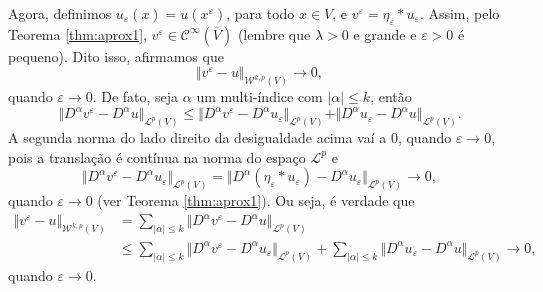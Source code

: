 \documentclass[a4paper, 11pt]{book}
\theoremstyle{definition}
\newcommand{\cC}{\mathcal{C}}
\newcommand{\cL}{\mathcal{L}}
\newcommand{\cW}{\mathcal{W}}
\begin{document}
\begin{prf}
    Agora, definimos $u_\varepsilon(x) = u(x^\varepsilon)$, para todo $x \in V$, e $v^\varepsilon = \eta_\varepsilon * u_\varepsilon$. Assim, pelo Teorema \ref{thm:aprox1}, $v^\varepsilon \in \cC^{\infty}(\overline{V})$ (lembre que $\lambda > 0$ e grande e $\varepsilon > 0$ é pequeno). 
    Dito isso, afirmamos que
    \[
        \Vert v^\varepsilon - u \Vert_{\cW^{k,p}(V)} \to 0,
    \]
    quando $\varepsilon \to 0$.
    De fato, seja $\alpha $ um multi-índice com $|\alpha| \leqslant k$, então
    \[
        \Vert D^\alpha v^\varepsilon - D^\alpha u \Vert_{\cL^p(V)} \leqslant \Vert D^\alpha v^\varepsilon - D^\alpha u_\varepsilon \Vert_{\cL^p(V)} + \Vert D^\alpha u_\varepsilon - D^\alpha u \Vert_{\cL^p(V)}.
    \]
   A segunda norma do lado direito da desigualdade acima vaí a $0$, quando $\varepsilon \to 0$, pois a translação é contínua na norma do espaço $\cL^p$ e
    \[
        \Vert D^\alpha v^\varepsilon - D^\alpha u_\varepsilon \Vert_{\cL^p(V)} = \Vert D^\alpha (\eta_\varepsilon * u_\varepsilon) - D^\alpha u_\varepsilon \Vert_{\cL^p(V)} \to 0,
    \]
    quando $\varepsilon \to 0$ (ver Teorema \ref{thm:aprox1}). Ou seja, é verdade que
    \[
        \begin{aligned}
            \Vert v^\varepsilon - u \Vert_{\cW^{k,p}(V)} &= \sum_{|\alpha| \leqslant k} \Vert D^\alpha v^\varepsilon - D^\alpha u \Vert_{\cL^p(V)} \\
            &\leqslant \sum_{|\alpha| \leqslant k} \Vert D^\alpha v^\varepsilon - D^\alpha u_\varepsilon \Vert_{\cL^p(V)} + \sum_{|\alpha| \leqslant k} \Vert D^\alpha u_\varepsilon - D^\alpha u \Vert_{\cL^p(V)} \to 0,
        \end{aligned}
    \]
    quando $\varepsilon \to 0$.


\end{prf}
\end{document}
